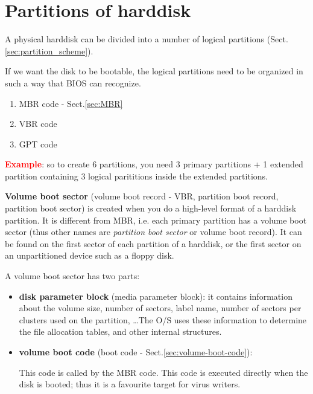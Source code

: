 \section{Partitions of harddisk}
\label{sec:partitions-harddisk}

A physical harddisk can be divided into a number of logical partitions
(Sect.\ref{sec:partition_scheme}).

If we want the disk to be bootable, the logical partitions need to be organized
in such a way that BIOS can recognize.
\begin{enumerate}
  \item MBR code - Sect.\ref{sec:MBR}
  
  \item VBR code
  
  
  \item GPT code 
\end{enumerate}


\textcolor{red}{\bf Example}: so to create 6 partitions, you need 3 primary
partitions + 1 extended partition containing 3 logical parititions inside the
extended partitions.


{\bf Volume boot sector} (volume boot record - VBR, partition boot record,
partition boot sector) is created when you do a high-level format of a harddisk
partition. 
It is different from MBR, i.e.
each primary partition has a volume boot sector (thus other names are {\it
partition boot sector} or volume boot record). It can be found on the first
sector of each partition of a harddisk, or the first sector on an unpartitioned
device such as a floppy disk.

\begin{mdframed}

A volume boot sector has two parts:
\begin{itemize}
  \item {\bf disk parameter block} (media parameter block): it contains
  information about the volume size, number of sectors, label name, number of sectors per
  clusters used on the partition, \ldots The O/S uses these information to
  determine the file allocation tables, and other internal structures. 
  
  \item {\bf volume boot code} (boot code - Sect.\ref{sec:volume-boot-code}): 
  
  
  This code is called by the MBR code. This code is executed directly when the
  disk is booted; thus it is a favourite target for virus writers.
  
\end{itemize}
\end{mdframed}


